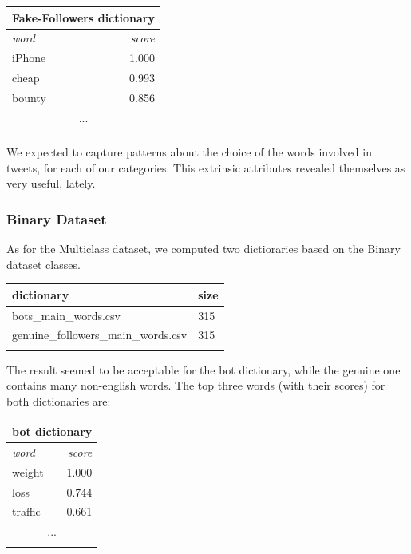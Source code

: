 \normalsize
\small
\begin{center}
	\begin{tabular}{lllll}
		\multicolumn{5}{c}{\textbf{Fake-Followers dictionary}} \\
		\hline\hline
		\multicolumn{4}{l}{\textit{word}} & 
		\multicolumn{1}{r}{\textit{score}}\\
		\hline\hline
		\multicolumn{4}{l}{iPhone} & 
		\multicolumn{1}{r}{1.000}\\
		\multicolumn{4}{l}{cheap} & 
		\multicolumn{1}{r}{0.993}\\
		\multicolumn{4}{l}{bounty} & 
		\multicolumn{1}{r}{0.856}\\
		\multicolumn{5}{c}{...} \\
		\hline\\
	\end{tabular}
\end{center}
\normalsize

We expected to capture patterns about the choice of the words involved in tweets, for each of our categories.
This extrinsic attributes revealed themselves as very useful, lately.

\subsubsection{Binary Dataset}
As for the Multiclass dataset, we computed two dictioraries based on the Binary dataset classes.

\small
\begin{center}
	\begin{tabular}{ll}
		\\dictionary&size\\
		\hline\hline
		bots\_main\_words.csv&315\\
		genuine\_followers\_main\_words.csv&315\\\hline\\
	\end{tabular}
\end{center}
\normalsize

The result seemed to be acceptable for the bot dictionary, while the genuine one contains many non-english words. The top three words (with their scores) for both dictionaries are:

\small
\begin{center}
	\begin{tabular}{lllll}
		\multicolumn{5}{c}{\textbf{bot dictionary}} \\
		\hline\hline
		\multicolumn{4}{l}{\textit{word}} & 
		\multicolumn{1}{r}{\textit{score}}\\
		\hline\hline
		\multicolumn{4}{l}{weight} & 
		\multicolumn{1}{r}{1.000}\\
		\multicolumn{4}{l}{loss} & 
		\multicolumn{1}{r}{0.744}\\
		\multicolumn{4}{l}{traffic} & 
		\multicolumn{1}{r}{0.661}\\
		\multicolumn{5}{c}{...} \\
		\hline\\
	\end{tabular}
\end{center}
\normalsize

